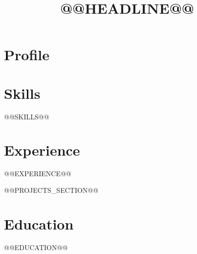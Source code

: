 \documentclass[11pt,a4paper,sans]{moderncv}
\title{@@HEADLINE@@}
\begin{document}
\makecvtitle

\section{Profile}

\section{Skills}
@@SKILLS@@

\section{Experience}
@@EXPERIENCE@@

@@PROJECTS_SECTION@@

\section{Education}
@@EDUCATION@@
\end{document}
